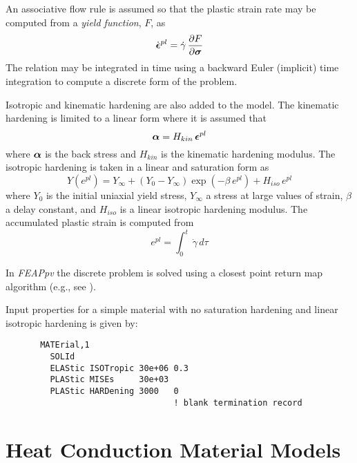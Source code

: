 An associative flow rule is assumed so that the plastic strain rate
may be computed from a {\it yield function}, $F$, as
\begin{equation}
\dot{\boldsymbol{\epsilon}}^{pl} = \dot{\gamma} \,
\frac{\partial F}{\partial \boldsymbol{\sigma}}
\end{equation}
The relation may be integrated in time using a backward Euler (implicit)
time integration to compute a discrete form of the problem.

Isotropic and kinematic hardening are also added to the model.  The kinematic
hardening is limited to a linear form where it is assumed that
\begin{equation}
\boldsymbol{\alpha} = H_{kin} \, \boldsymbol{\epsilon}^{pl}
\end{equation}
where $\boldsymbol{\alpha}$ is the back stress and $H_{kin}$ is the kinematic hardening
modulus.  The isotropic hardening is taken in a linear and saturation form
as
\begin{equation}
Y(e^{pl}) = Y_{\infty} + (Y_0 - Y_{\infty}) \exp (- \beta \, e^{pl})
+ H_{iso} \, e^{pl}
\end{equation}
where $Y_0$ is the initial uniaxial yield stress, $Y_{\infty}$ a stress
at large values of strain, $\beta$ a delay constant, and $H_{iso}$ is a linear
isotropic hardening modulus.  The accumulated plastic strain is computed
from
\begin{equation}
e^{pl} = \int_0^t \, \dot{\gamma} \, d \tau
\end{equation}

In {\sl FEAPpv} the discrete problem is solved using a closest point return
map algorithm (e.g., see \cite{simort85,simort86,simo:hughes}).

Input properties for a simple material with no saturation hardening and
linear isotropic hardening is given by:
\begin{verbatim}
       MATErial,1
         SOLId
         ELAStic ISOTropic 30e+06 0.3
         PLAStic MISEs     30e+03
         PLAStic HARDening 3000   0
                                  ! blank termination record
\end{verbatim}

\section{Heat Conduction Material Models}
\label{heat}

